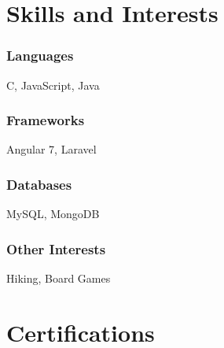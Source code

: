 \documentclass[12pt]{res} %
\begin{document}
\begin{resume}
        \section{Skills and Interests}
          \vspace{3pt}

          \begin{multicols}{4}

            \subsubsection{Languages}
            \vspace{-22pt}
            C, JavaScript, Java
            \vspace{-28pt}

            \subsubsection{Frameworks}
            \vspace{-22pt}
            Angular 7, Laravel
            \vspace{-28pt}

            \subsubsection{Databases}
            \vspace{-22pt}
            MySQL, MongoDB
            \vspace{-28pt}

            \subsubsection{Other Interests}
            \vspace{-22pt}
            Hiking, Board Games

            \vspace{-10pt}

          \end{multicols}
        \vspace{-24pt}

      \section{Certifications} 


\end{resume}
\end{document}
